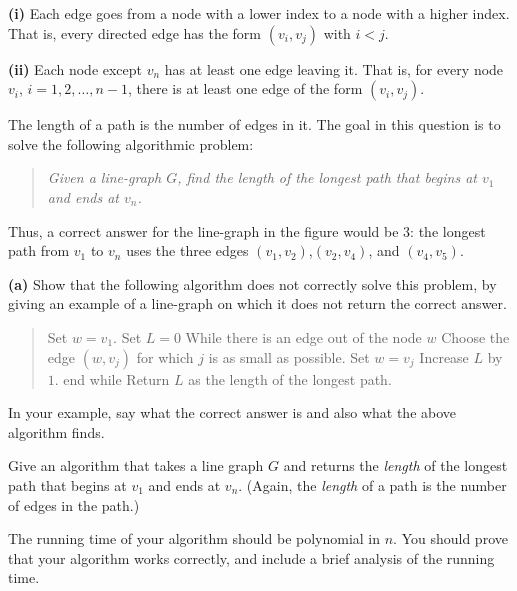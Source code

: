 \documentclass[12pt]{article}
\begin{document}
\begin{enumerate}
{\bf (i)}
Each edge goes from a node with a lower index
to a node with a higher index.
That is, every directed edge has the form
$(v_i, v_j)$ with $i < j$.

\smallskip

{\bf (ii)} Each node except $v_n$ has at least one edge leaving it.
That is, for every node $v_i$, $i = 1, 2, \ldots, n-1$,
there is at least one edge of the form $(v_i,v_j)$.

\smallskip

The length of a path is the number of edges in it.
The goal in this question is to solve the following algorithmic
problem:
\begin{quote}
{\em Given a line-graph $G$, find the length of the longest path that begins
at $v_1$ and ends at $v_n$.}
\end{quote}

Thus, a correct answer for the line-graph in the figure would be $3$:
the longest path from $v_1$ to $v_n$ uses the three edges
$(v_1, v_2)$,$(v_2, v_4)$, and $(v_4,v_5)$.

{\bf (a)}  Show that the following algorithm does not
correctly solve this problem, by giving an example of a line-graph on
which it does not return the correct answer.
\begin{quote}
\begin{code}
Set $w = v_1$.
Set $L = 0$
While there is an edge out of the node $w$
  Choose the edge $(w,v_j)$
     for which $j$ is as small as possible.
  Set $w = v_j$
  Increase $L$ by $1$.
end while
Return $L$ as the length of the longest path.
\end{code}
\end{quote}
In your example, say what the correct answer is and
also what the above algorithm finds.

Give an algorithm that takes a line graph $G$ and returns the
{\em length} of the longest path that begins at $v_1$ and ends at $v_n$.
(Again, the {\em length} of a path is the number of edges in the path.)

The running time of your algorithm should be polynomial in $n$.
You should prove that your algorithm works correctly, and include a
brief analysis of the running time.

\end{enumerate}
\end{document}
